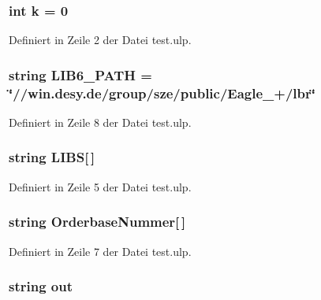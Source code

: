 \subsubsection[{k}]{\setlength{\rightskip}{0pt plus 5cm}int k = 0}\label{test_8ulp_ab66ed8e0098c0a86b458672a55a9cca9}


Definiert in Zeile 2 der Datei test.\+ulp.

\hypertarget{test_8ulp_a44dc1eefd5382033cf032f578a0130b9}{}
\subsubsection[{L\+I\+B6\+\_\+\+P\+A\+T\+H}]{\setlength{\rightskip}{0pt plus 5cm}string L\+I\+B6\+\_\+\+P\+A\+T\+H = \char`\"{}//win.\+desy.\+de/group/sze/public/Eagle\+\_+/lbr\char`\"{}}\label{test_8ulp_a44dc1eefd5382033cf032f578a0130b9}


Definiert in Zeile 8 der Datei test.\+ulp.

\hypertarget{test_8ulp_ab79ee21fe4aae7937f99de5b9c7b7d2c}{}
\subsubsection[{L\+I\+B\+S}]{\setlength{\rightskip}{0pt plus 5cm}string L\+I\+B\+S\mbox{[}$\,$\mbox{]}}\label{test_8ulp_ab79ee21fe4aae7937f99de5b9c7b7d2c}


Definiert in Zeile 5 der Datei test.\+ulp.

\hypertarget{test_8ulp_a57ba39a1335c8ae9ef4eb8314d51160e}{}
\subsubsection[{Orderbase\+Nummer}]{\setlength{\rightskip}{0pt plus 5cm}string Orderbase\+Nummer\mbox{[}$\,$\mbox{]}}\label{test_8ulp_a57ba39a1335c8ae9ef4eb8314d51160e}


Definiert in Zeile 7 der Datei test.\+ulp.

\hypertarget{test_8ulp_a43b9274914173cbec050c89b07f1824b}{}
\subsubsection[{out}]{\setlength{\rightskip}{0pt plus 5cm}string out}\label{test_8ulp_a43b9274914173cbec050c89b07f1824b}



